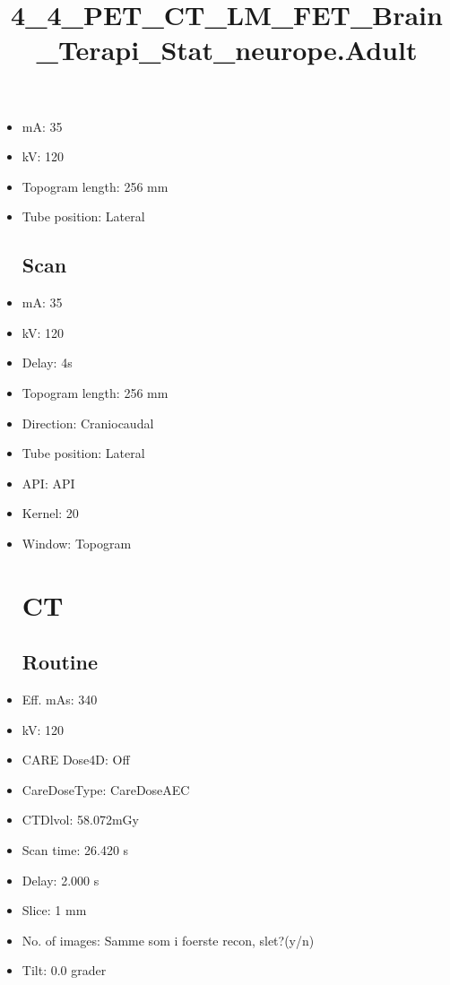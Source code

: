 \documentclass[12pt]{article}
\title{4\_4\_PET\_CT\_LM\_FET\_Brain\_Terapi\_Stat\_neurope.Adult}
\begin{document}
\maketitle
\newpage
\tableofcontents
\newpage
{}


\begin{itemize}\section{Topogram}
\subsection{Routine}
\item mA: 35\item kV: 120\item Topogram length: 256 mm\item Tube position: Lateral
\subsection{Scan}\item mA: 35\item kV: 120\item Delay: 4s\item Topogram length: 256 mm\item Direction: Craniocaudal\item Tube position: Lateral\item API: API \item Kernel: 20\item Window: Topogram
\section{CT}
\subsection{Routine}
\item Eff. mAs: 340\item kV: 120\item CARE Dose4D: Off\item CareDoseType: CareDoseAEC\item CTDlvol: 58.072mGy\item Scan time: 26.420 s\item Delay: 2.000 s\item Slice: 1 mm\item No. of images: Samme som i foerste recon, slet?(y/n)\item Tilt: 0.0 grader

\end{itemize}
\end{document}
